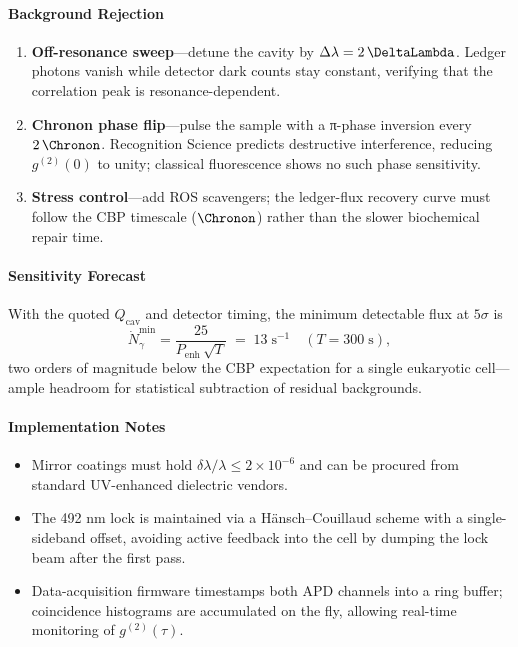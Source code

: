 \documentclass[11pt,oneside]{book}
\begin{document}
{\paragraph{Background Rejection}

\begin{enumerate}\setlength\itemsep{3pt}
\item \textbf{Off-resonance sweep}—detune the cavity by
\(\Delta\lambda=2\,\DeltaLambda\).
Ledger photons vanish while detector dark counts stay constant,
verifying that the correlation peak is resonance-dependent.
\item \textbf{Chronon phase flip}—pulse the sample with a
π-phase inversion every \(2\,\Chronon\).
Recognition Science predicts destructive interference,
reducing \(g^{(2)}(0)\) to unity; classical fluorescence
shows no such phase sensitivity.
\item \textbf{Stress control}—add ROS scavengers; the ledger-flux
recovery curve must follow the CBP timescale (\(\Chronon\))
rather than the slower biochemical repair time.
\end{enumerate}

\paragraph{Sensitivity Forecast}

With the quoted \(Q_{\text{cav}}\) and detector timing,
the minimum detectable flux at \(5\sigma\) is
\[
   \dot N_{\gamma}^{\text{min}}
   =
   \frac{25}{P_{\text{enh}}\,\sqrt{T}}
   \;=\;
   13\;\text{s}^{-1}\quad(T=300\;\text{s}),
\]
two orders of magnitude below the CBP expectation
for a single eukaryotic cell—ample headroom for statistical
subtraction of residual backgrounds.

\paragraph*{Implementation Notes}

\begin{itemize}\setlength\itemsep{3pt}
\item Mirror coatings must hold
\(\delta\lambda/\lambda\le2\times10^{-6}\)
and can be procured from standard UV-enhanced dielectric vendors.
\item The 492 nm lock is maintained via a Hänsch–Couillaud scheme
with a single-sideband offset, avoiding active feedback into the cell
by dumping the lock beam after the first pass.
\item Data-acquisition firmware timestamps both APD channels
into a ring buffer; coincidence histograms are accumulated on the fly,
allowing real-time monitoring of \(g^{(2)}(\tau)\).
\end{itemize}

}
\end{document}
